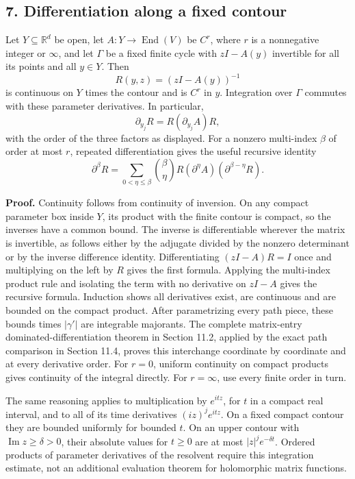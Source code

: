 \documentclass[
  11pt,
]{article}
\begin{document}
\subsection{7. Differentiation along a fixed
contour}\label{differentiation-along-a-fixed-contour}

Let \(Y\subseteq\mathbb R^d\) be open, let
\(A:Y\to\operatorname{End}(V)\) be \(C^r\), where \(r\) is a nonnegative
integer or \(\infty\), and let \(\Gamma\) be a fixed finite cycle with
\(zI-A(y)\) invertible for all its points and all \(y\in Y\). Then \[
R(y,z)=(zI-A(y))^{-1}
\] is continuous on \(Y\) times the contour and is \(C^r\) in \(y\).
Integration over \(\Gamma\) commutes with these parameter derivatives.
In particular, \[
\partial_{y_j}R=R(\partial_{y_j}A)R,
\] with the order of the three factors as displayed. For a nonzero
multi-index \(\beta\) of order at most \(r\), repeated differentiation
gives the useful recursive identity \[
\partial^\beta R
=\sum_{0<\eta\leq\beta}\binom\beta\eta
R(\partial^\eta A)(\partial^{\beta-\eta}R).
\]

\textbf{Proof.} Continuity follows from continuity of inversion. On any
compact parameter box inside \(Y\), its product with the finite contour
is compact, so the inverses have a common bound. The inverse is
differentiable wherever the matrix is invertible, as follows either by
the adjugate divided by the nonzero determinant or by the inverse
difference identity. Differentiating \((zI-A)R=I\) once and multiplying
on the left by \(R\) gives the first formula. Applying the multi-index
product rule and isolating the term with no derivative on \(zI-A\) gives
the recursive formula. Induction shows all derivatives exist, are
continuous and are bounded on the compact product. After parametrizing
every path piece, these bounds times \(|\gamma'|\) are integrable
majorants. The complete matrix-entry dominated-differentiation theorem
in Section 11.2, applied by the exact path comparison in Section 11.4,
proves this interchange coordinate by coordinate and at every derivative
order. For \(r=0\), uniform continuity on compact products gives
continuity of the integral directly. For \(r=\infty\), use every finite
order in turn.

The same reasoning applies to multiplication by \(e^{itz}\), for \(t\)
in a compact real interval, and to all of its time derivatives
\((iz)^j e^{itz}\). On a fixed compact contour they are bounded
uniformly for bounded \(t\). On an upper contour with
\(\operatorname{Im}z\geq\delta>0\), their absolute values for \(t\geq0\)
are at most \(|z|^j e^{-\delta t}\). Ordered products of parameter
derivatives of the resolvent require this integration estimate, not an
additional evaluation theorem for holomorphic matrix functions.
\end{document}
